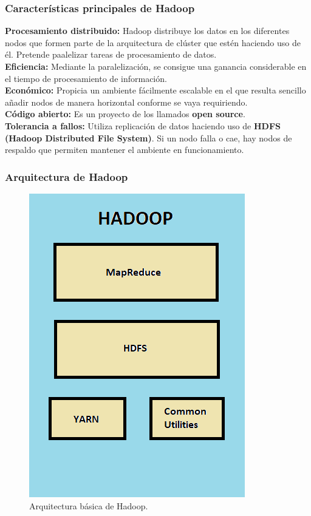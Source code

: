 \subsubsection{Características principales de Hadoop}

\begin{UClist}
	\UCli \textbf{Procesamiento distribuido:} Hadoop distribuye los datos en los diferentes nodos que formen parte de la arquitectura de clúster que estén haciendo uso de él. Pretende paalelizar tareas de procesamiento de datos.\\
	\UCli \textbf{Eficiencia:} Mediante la paralelización, se consigue una ganancia considerable en el tiempo de procesamiento de información.\\
	\UCli \textbf{Económico:} Propicia un ambiente fácilmente escalable en el que resulta sencillo añadir nodos de manera horizontal conforme se vaya requiriendo.\\
	\UCli \textbf{Código abierto:} Es un proyecto de los llamados \textbf{open source}.\\
	\UCli \textbf{Tolerancia a fallos:} Utiliza replicación de datos haciendo uso de \textbf{HDFS (Hadoop Distributed File System)}. Si un nodo falla o cae, hay nodos de respaldo que permiten mantener el ambiente en funcionamiento.\\
\end{UClist}

\newpage
\subsubsection{Arquitectura de Hadoop}
\begin{figure}[H]
	\begin{center}
		\hypertarget{fig:hadoopComponentes}{\hspace{1pt}}
		\includegraphics{capitulo2/images/hadoopComponentes.png}
		\caption{Arquitectura básica de Hadoop.}
		\label{fig:hadoopComponentes}
	\end{center}
\end{figure}

